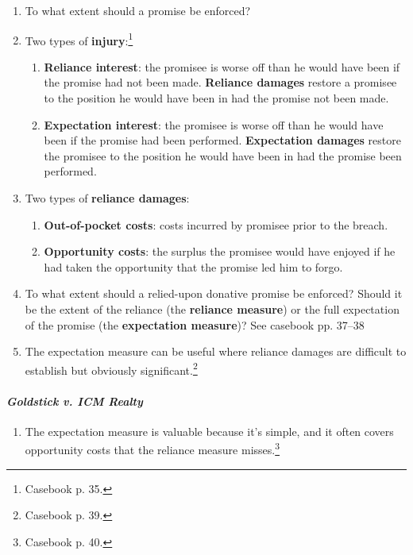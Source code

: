 \begin{enumerate}
    \item To what extent should a promise be enforced?
    \item Two types of \textbf{injury}:\footnote{Casebook p. 35.}
    \begin{enumerate}
        \item \textbf{Reliance interest}: the promisee is worse off than he 
        would have been if the promise had not been made. \textbf{Reliance 
        damages} restore a promisee to the position he would have been in had 
        the promise not been made. %
        \item \textbf{Expectation interest}: the promisee is worse off than he 
        would have been if the promise had been performed. \textbf{Expectation 
        damages} restore the promisee to the position he would have been in 
        had the promise been performed. %
    \end{enumerate}
    \item Two types of \textbf{reliance damages}:
    \begin{enumerate}
        \item \textbf{Out-of-pocket costs}: costs incurred by promisee prior 
        to the breach. %
        \item \textbf{Opportunity costs}: the surplus the promisee would have 
        enjoyed if he had taken the opportunity that the promise led him to 
        forgo.
    \end{enumerate}
    \item To what extent should a relied-upon donative promise be enforced? 
    Should it be the extent of the reliance (the \textbf{reliance measure}) or 
    the full expectation of the promise (the \textbf{expectation measure})? See 
    casebook pp. 37--38 %
    \item The expectation measure can be useful where reliance damages are 
    difficult to establish but obviously significant.\footnote{Casebook p. 39.}
\end{enumerate}

\paragraph{\emph{Goldstick v. ICM Realty}}

\begin{enumerate}
    \item The expectation measure is valuable because it's simple, and it 
    often covers opportunity costs that the reliance measure 
    misses.\footnote{Casebook p. 40.}
\end{enumerate}

